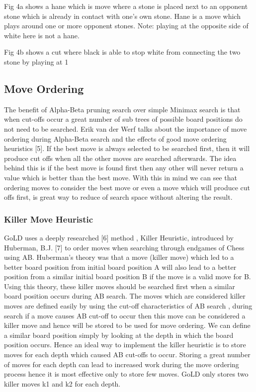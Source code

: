 \documentclass{l4proj}
\begin{document}
Fig 4a shows a hane which is move where a stone is placed next to an opponent stone which is already in contact with one’s own stone. Hane is a move which plays around one or more opponent stones. Note: playing at the opposite side of white here is not a hane.

Fig 4b shows a cut where black is able to stop white from connecting the two stone by playing at 1




\subsection{Move Ordering}
The benefit of Alpha-Beta pruning search over simple Minimax search is that when cut-offs occur a great number of sub trees of possible board positions do not need to be searched. Erik van der Werf  talks about the importance of  move ordering during Alpha-Beta search and the effects of good move ordering heuristics [5]. If the best move is always selected to be searched first, then it will produce cut offs when all the other moves are searched afterwards. The idea behind this is if the best move is found first then any other will never return a value which is better than the best move. With this in mind we can see that ordering moves to consider the best move or even a move which will produce cut offs first, is great way to reduce of search space without altering the result.

\subsubsection{Killer Move Heuristic}
GoLD uses a deeply researched [6] method , Killer Heuristic, introduced by Huberman, B.J. [7] to order moves when searching through endgames of Chess using AB. Huberman’s theory was that a move (killer move) which led to a better board position from initial board position A will also lead to a better position from a similar initial board position B if the move is a valid move for B.  Using this theory, these killer moves should be searched first when a similar board position occurs during AB search. The moves which are considered killer moves are defined easily by using the cut-off characteristics of AB search , during search if a move causes AB cut-off to occur then this move can be considered a killer move and hence will be stored to be used for move ordering.  We can define a similar board position simply by looking at the depth in which the board position occurs. Hence an ideal way to implement the killer heuristic is to store moves for each depth which caused AB cut-offs to occur. Storing a great number of moves for each depth can lead to increased work during the move ordering process hence it is most effective only to store few moves. GoLD only stores two killer moves k1 and k2  for each depth.
\end{document}
